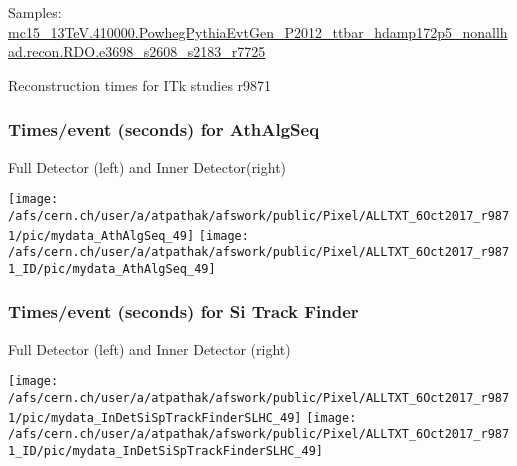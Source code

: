 \documentclass{beamer}
\begin{document}
\begin{frame}
\begin{center}
\vspace*{.1cm}
{\scriptsize{Samples: \url{mc15_13TeV.410000.PowhegPythiaEvtGen_P2012_ttbar_hdamp172p5_nonallhad.recon.RDO.e3698_s2608_s2183_r7725}}}
\vspace*{.1cm}
\end{center}



\end{frame}
\begin{frame}
\begin{Large}
\centerline{Reconstruction times for ITk studies r9871}
\end{Large}
\end{frame}
\begin{frame}
\frametitle{Times/event (seconds) for AthAlgSeq}
\begin{center}
\begin{normalsize}
Full Detector (left)  and Inner Detector(right) \\
\vspace*{-.2cm}
\begin{center}
\texttt{[image: /afs/cern.ch/user/a/atpathak/afswork/public/Pixel/ALLTXT\_6Oct2017\_r9871/pic/mydata\_AthAlgSeq\_49]}
\texttt{[image: /afs/cern.ch/user/a/atpathak/afswork/public/Pixel/ALLTXT\_6Oct2017\_r9871\_ID/pic/mydata\_AthAlgSeq\_49]}

\end{center}
\end{normalsize}
\end{center}
\end{frame}
\begin{frame}
\frametitle{Times/event (seconds) for Si Track Finder}
\begin{center}
\begin{normalsize}
Full Detector (left)  and Inner Detector (right) \\
\vspace*{-.2cm}
\begin{center}
\texttt{[image: /afs/cern.ch/user/a/atpathak/afswork/public/Pixel/ALLTXT\_6Oct2017\_r9871/pic/mydata\_InDetSiSpTrackFinderSLHC\_49]}
\texttt{[image: /afs/cern.ch/user/a/atpathak/afswork/public/Pixel/ALLTXT\_6Oct2017\_r9871\_ID/pic/mydata\_InDetSiSpTrackFinderSLHC\_49]}

\end{center}
\end{normalsize}
\end{center}
\end{frame}
\end{document}
